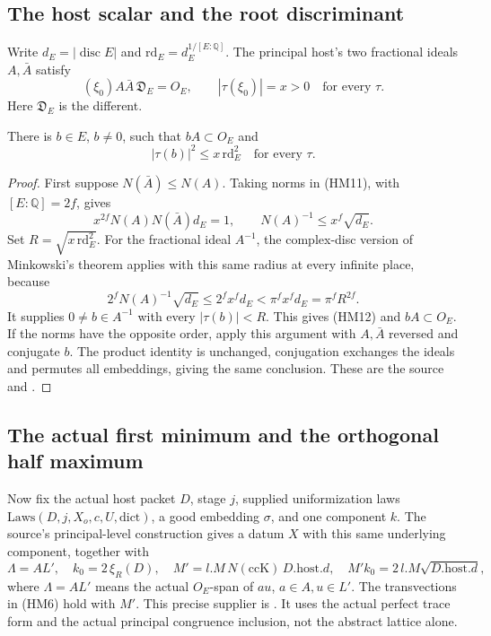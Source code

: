 \subsection{The host scalar and the root discriminant}
Write \(d_E=|\operatorname{disc}E|\) and
\(\mathrm{rd}_E=d_E^{1/[E:\mathbb Q]}\).
The principal host's two fractional ideals \(A,\bar A\) satisfy
\[
                 (\xi_0)A\bar A\,\mathfrak D_E=O_E,\qquad
                 |\tau(\xi_0)|=x>0\quad\text{for every }\tau .
 \tag{HM11}\label{eq:sr-source-host-ideal}
\]
Here \(\mathfrak D_E\) is the different.

\begin{srlemma}\label{lem:sr-source-small-inverse}
There is \(b\in E\), \(b\ne0\), such that
\(bA\subset O_E\) and
\[
                        |\tau(b)|^2\le x\,\mathrm{rd}_E^2
                            \quad\text{for every }\tau.
 \tag{HM12}\label{eq:sr-source-small-inverse}
\]
\end{srlemma}
\begin{proof}
First suppose \(N(\bar A)\le N(A)\).
Taking norms in (HM11), with \([E:\mathbb Q]=2f\), gives
\[
                  x^{2f}N(A)N(\bar A)d_E=1,
       \qquad N(A)^{-1}\le x^f\sqrt{d_E}.
\]
Set \(R=\sqrt{x\,\mathrm{rd}_E^2}\).
For the fractional ideal \(A^{-1}\), the complex-disc version
of Minkowski's theorem applies with this same radius at every
infinite place, because
\[
 2^fN(A)^{-1}\sqrt{d_E}
        \le2^fx^fd_E
        <\pi^fx^fd_E=\pi^fR^{2f}.
\]
It supplies \(0\ne b\in A^{-1}\) with every \(|\tau(b)|<R\).
This gives (HM12) and \(bA\subset O_E\).
If the norms have the opposite order, apply this argument with
\(A,\bar A\) reversed and conjugate \(b\).
The product identity is unchanged, conjugation exchanges the
ideals and permutes all embeddings, giving the same conclusion.
These are the source
 and
.
\end{proof}

\subsection{The actual first minimum and the orthogonal half maximum}
Now fix the actual host packet \(D\), stage \(j\), supplied
uniformization laws \(\mathrm{Laws}(D,j,X_o,c,U,\mathrm{dict})\),
a good embedding \(\sigma\), and one component \(k\).
The source's principal-level construction gives a datum \(X\)
with this same underlying component, together with
\[
 \Lambda=A L',\quad k_0=2\,\xi_R(D),\quad
 M'=l.M\,N(\mathrm{ccK})\,D.\mathrm{host}.d,\quad
 M'k_0=2\,l.M\sqrt{D.\mathrm{host}.d},
 \tag{HM13}\label{eq:sr-source-transvection-data}
\]
where \(\Lambda=AL'\) means the actual \(O_E\)-span of
\(au\), \(a\in A,u\in L'\).
The transvections in (HM6) hold with \(M'\).
This precise supplier is
.
It uses the actual perfect trace form and the actual principal
congruence inclusion, not the abstract lattice alone.

